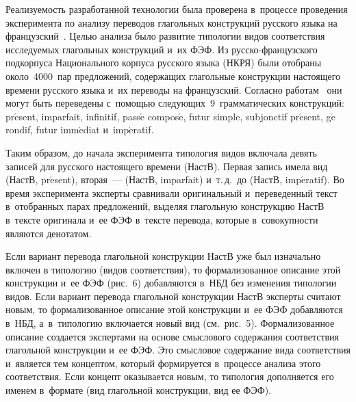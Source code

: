 {\begin{multicols}{2}
      
      Реализуемость разработанной технологии была проверена в~процессе проведения 
эксперимента по анализу переводов глагольных конструкций русского языка на 
французский~\cite{25-zat}. Целью анализа было развитие типологии видов соответствия 
исследуемых глагольных конструкций и~их ФЭФ. Из рус\-ско-фран\-цуз\-ско\-го 
подкорпуса Национального корпуса русского языка (НКРЯ) были отобраны\linebreak 
около~4000~пар предложений, содержащих глагольные конструкции настоящего времени 
русского языка и~их переводы на французский. Согласно работам~\cite{35-zat, 36-zat} они 
могут быть переведены с~помощью следующих~9~грамматических конструкций: 
pr$\acute{\mbox{e}}$sent, imparfait, infinitif, pass$\acute{\mbox{e}}$ 
compos$\acute{\mbox{e}}$, futur simple, subjonctif pr$\acute{\mbox{e}}$sent, 
g$\acute{\mbox{e}}$rondif, futur imm$\acute{\mbox{e}}$diat и~imp$\acute{\mbox{e}}$ratif.
      
      Таким образом, до начала эксперимента типология видов включала девять записей 
для русского настоящего времени (НастВ). Первая запись имела вид (НастВ, pr$\acute{\mbox{e}}$sent), 
вторая~--- (НастВ, imparfait) и~т.\,д.\ до (НастВ, imp$\acute{\mbox{e}}$ratif). Во время эксперимента эксперты 
сравнивали оригинальный и~переведенный текст в~отобранных парах предложений, выделяя 
глагольную конструкцию НастВ в~тексте оригинала и~ее ФЭФ в~тексте перевода, которые 
в~совокупности являются денотатом.
      
      Если вариант перевода глагольной конструкции НастВ уже был изначально включен 
в типологию (видов соответствия), то формализованное описание этой конструкции и~ее 
ФЭФ (рис.~6) до\-бав\-ля\-ют\-ся в~НБД без изменения типологии видов. Если вариант 
перевода глагольной конструкции НастВ эксперты считают новым, то формализованное 
описание этой конструкции и~ее ФЭФ добавляются в~НБД, а~в~типологию включается 
новый вид (см.\ рис.~5). Формализованное описание создается экспертами на основе 
смыслового содержания соответствия глагольной конструкции и~ее ФЭФ. Это смысловое 
содержание вида соответствия и~является тем концептом, который формируется в~процессе 
анализа этого соответствия. Если концепт оказывается новым, то типология дополняется 
его именем в~формате (вид глагольной конструкции, вид ее ФЭФ).

\begin{table*}\small
\begin{center}
\vspace*{2ex}


\end{center}
\end{table*}
\end{multicols}}
